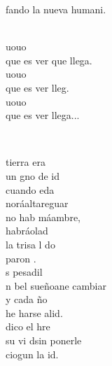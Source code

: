 \documentclass[12pt]{article}
\begin{document}
\begin{multicols*}{2}
\begin{cancion}
	 fando la nueva humani. \\\jump\\
	\begin{chorus}%
	uouo  \\
	que es ver que llega.\\
	uouo \\
	que es ver  lleg. \\
	uouo \\
	que es ver  llega...\\
	\end{chorus}%
	\jump\\
\end{cancion}%

\begin{cancion}%
	 tierra era\\
	 un gno de id\\
	cuando eda\\
	noráaltareguar\\
	no hab máambre,\\
	habráolad\\
	la trisa l do\\
	paron .\\
	s pesadil\\
	n bel sueñoane cambiar\\
	y cada ño\\
	he harse alid.\\
	 dico el hre \\
	 su vi dsin ponerle\\
	ciogun la id.\\
\end{cancion}%


\end{multicols*}
\end{document}
